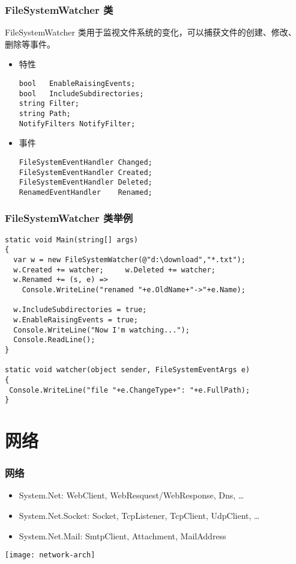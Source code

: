 \begin{frame}[fragile]
\frametitle{FileSystemWatcher 类}
\CJKindent FileSystemWatcher 类用于监视文件系统的变化，可以捕获文件的创建、修改、
删除等事件。

\begin{itemize}
\item 特性
\begin{lstlisting}
bool   EnableRaisingEvents;
bool   IncludeSubdirectories;
string Filter;
string Path;
NotifyFilters NotifyFilter;
\end{lstlisting}
\item 事件
\begin{lstlisting}
FileSystemEventHandler Changed;
FileSystemEventHandler Created;
FileSystemEventHandler Deleted;
RenamedEventHandler    Renamed;
\end{lstlisting}
\end{itemize}
\end{frame}


\begin{frame}[fragile]
\frametitle{FileSystemWatcher 类举例}
\begin{lstlisting}
static void Main(string[] args)
{
  var w = new FileSystemWatcher(@"d:\download","*.txt");
  w.Created += watcher;     w.Deleted += watcher;
  w.Renamed += (s, e) => 
    Console.WriteLine("renamed "+e.OldName+"->"+e.Name);

  w.IncludeSubdirectories = true;
  w.EnableRaisingEvents = true;
  Console.WriteLine("Now I'm watching...");
  Console.ReadLine();
}

static void watcher(object sender, FileSystemEventArgs e)
{
 Console.WriteLine("file "+e.ChangeType+": "+e.FullPath);
}
\end{lstlisting}
\end{frame}


\section{网络}

\begin{frame}
\frametitle{网络}
\begin{itemize}
\item System.Net: {\scriptsize WebClient, WebResquest/WebResponse, Dns, \ldots}
\item System.Net.Socket: {\scriptsize Socket, TcpListener, TcpClient, UdpClient, \ldots}
\item System.Net.Mail: {\scriptsize SmtpClient, Attachment, MailAddress}
\end{itemize}
\centering \texttt{[image: network-arch]}
\end{frame}


